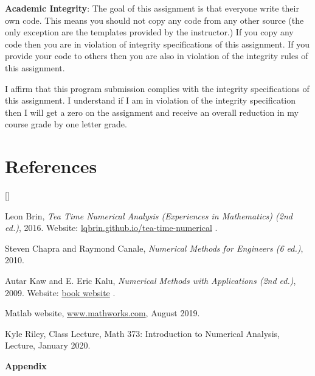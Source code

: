 \documentclass{article}
\def\beginrefs{\begin{list}%
        {[\arabic{equation}]}{\usecounter{equation}
         \setlength{\leftmargin}{2.0truecm}\setlength{\labelsep}{0.4truecm}%
         \setlength{\labelwidth}{1.6truecm}}}
\def\endrefs{\end{list}}
\def\bibentry#1{\item[\hbox{[#1]}]}
\begin{document}

{\bf Academic Integrity}: {\color{black} The goal of this assignment is that everyone write their own code. This means you should not copy any code from any other source (the only exception are the templates provided by the instructor.) If you copy any code then you are in violation of integrity specifications of this assignment. If you provide your code to others then you are also in violation of the integrity rules of this assignment. }
 
 I affirm that this program submission complies with the integrity specifications of this assignment. I understand if I am in violation of the integrity specification then I will get a zero on the assignment and receive an overall reduction in my course grade by one letter grade. 

\section*{References}
\beginrefs


\bibentry{LB16}{\sc Leon Brin},
{\it Tea Time Numerical Analysis (Experiences in Mathematics)  (2nd ed.)}, 2016. Website: \href{http://lqbrin.github.io/tea-time-numerical/}{lqbrin.github.io/tea-time-numerical} .

\bibentry{CC10}{\sc Steven Chapra} and {\sc Raymond Canale}, {\it Numerical Methods for Engineers (6 ed.)}, 2010. 

\bibentry{KK09} {\sc Autar Kaw} and {\sc E. Eric Kalu}, {\it Numerical Methods with Applications (2nd ed.)}, 2009. Website: \href{http://autarkaw.com/books/numericalmethods/index.html}{book website} .

\bibentry{Matlab} {\sc Matlab website}, \href{https://www.mathworks.com}{www.mathworks.com}, August 2019. %

\bibentry{KR20} {\sc Kyle Riley}, Class Lecture, Math 373: Introduction to Numerical Analysis, Lecture, January 2020. 

\endrefs

\bigskip \par \bigskip
{\Large {\bf Appendix}} \par \medskip
\end{document}
